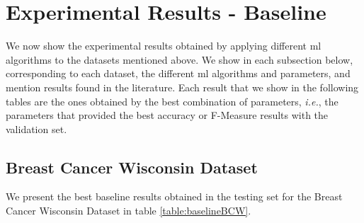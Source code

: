 \section{Experimental Results - Baseline}
\label{sec:ExperimentalResultsBaseline}


We now show the experimental results obtained by applying different \ac{ml} algorithms to the datasets mentioned above. We show in each subsection below, corresponding to each dataset, the different \ac{ml} algorithms and parameters, and mention results found in the literature. Each result that we show in the following tables are the ones obtained by the best combination of parameters, \textit{i.e.}, the parameters that provided the best accuracy or F-Measure results with the validation set.

\subsection{Breast Cancer Wisconsin Dataset}

We present the best baseline results obtained in the testing set for the Breast Cancer Wisconsin Dataset in table \ref{table:baselineBCW}.

